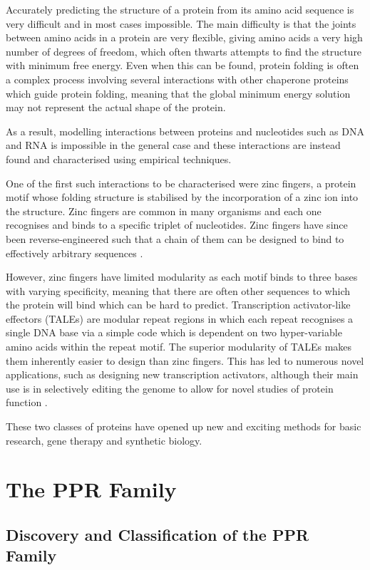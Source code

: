 Accurately predicting the structure of a protein from its amino acid sequence 
is very difficult and in most cases impossible.
The main difficulty is that the joints between amino acids in a protein are
very flexible, giving amino acids a very high number of degrees of freedom,
which often thwarts attempts to find the structure with minimum free energy.
Even when this can be found, protein folding is often a complex process
involving several interactions with other chaperone proteins which guide
protein folding, meaning that the global minimum energy solution may not 
represent the actual shape of the protein.

As a result, modelling interactions between proteins and nucleotides such as
DNA and RNA is impossible in the general case and these interactions are
instead found and characterised using empirical techniques.

One of the first such interactions to be characterised were zinc fingers, a
protein motif whose folding structure is stabilised by the incorporation of a
zinc ion into the structure.
Zinc fingers are common in many organisms and each one recognises and binds to 
a specific triplet of nucleotides.
Zinc fingers have since been reverse-engineered such that a chain of them can
be designed to bind to effectively arbitrary sequences 
\citep[reviewed in][]{Gaj2013}.

However, zinc fingers have limited modularity as each motif binds to three
bases with varying specificity, meaning that there are often other sequences to
which the protein will bind which can be hard to predict.
Transcription activator-like effectors (TALEs) are modular repeat regions in
which each repeat recognises a single DNA base via a simple code which is
dependent on two hyper-variable amino acids within the repeat motif.
The superior modularity of TALEs makes them inherently easier to design than 
zinc fingers.
This has led to numerous novel applications, such as designing new 
transcription activators, although their main use is in selectively editing 
the genome to allow for novel studies of protein function 
\citep[reviewed in][]{Sun2013}.

These two classes of proteins have opened up new and exciting methods for basic
research, gene therapy and synthetic biology.

\section{The PPR Family}
\label{sec:review_PPR}
\subsection{Discovery and Classification of the PPR Family}

